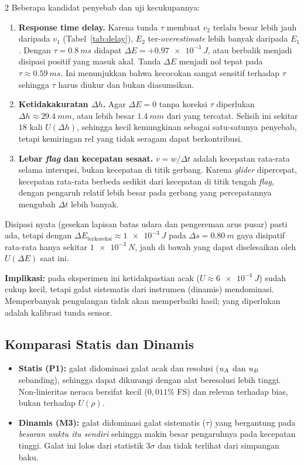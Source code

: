 \documentclass[a4paper, 12pt]{article}
\begin{document}
\begin{multicols}{2}
        Beberapa kandidat penyebab dan uji kecukupannya:
        \begin{enumerate}
            \item \textbf{Response time delay.} Karena tunda $\tau$ membuat $v_2$ terlalu besar lebih jauh daripada $v_1$ (Tabel~\ref{tab:delay}), $E_2$ ter-\textit{overestimate} lebih banyak daripada $E_1$. Dengan $\tau=\SI{0,8}{ms}$ didapat $\Delta E=+\SI{0,97e-3}{J}$, atau berbalik menjadi disipasi positif yang masuk akal. Tanda $\Delta E$ menjadi nol tepat pada $\tau\approx\SI{0,59}{ms}$. Ini menunjukkan bahwa kecocokan sangat sensitif terhadap $\tau$ sehingga $\tau$ harus diukur dan bukan diasumsikan.
            \item \textbf{Ketidakakuratan $\Delta h$.} Agar $\Delta E=0$ tanpa koreksi $\tau$ diperlukan $\Delta h\approx\SI{29,4}{mm}$, atau lebih besar $\SI{1,4}{mm}$ dari yang tercatat. Selisih ini sekitar $18$ kali $U(\Delta h)$, sehingga kecil kemungkinan sebagai satu-satunya penyebab, tetapi kemiringan rel yang tidak seragam dapat berkontribusi.
            \item \textbf{Lebar \textit{flag} dan kecepatan sesaat.} $v=w/\Delta t$ adalah kecepatan rata-rata selama interupsi, bukan kecepatan di titik gerbang. Karena \textit{glider} dipercepat, kecepatan rata-rata berbeda sedikit dari kecepatan di titik tengah \textit{flag}, dengan pengaruh relatif lebih besar pada gerbang yang percepatannya mengubah $\Delta t$ lebih banyak.
        \end{enumerate}
        Disipasi nyata (gesekan lapisan batas udara dan pengereman arus pusar) pasti ada, tetapi dengan $\Delta E_{\text{terkoreksi}}\approx\SI{1e-3}{J}$ pada $\Delta s=\SI{0,80}{m}$ gaya disipatif rata-rata hanya sekitar $\SI{1e-3}{N}$, jauh di bawah yang dapat diselesaikan oleh $U(\Delta E)$ saat ini.

        \textbf{Implikasi:} pada eksperimen ini ketidakpastian acak ($U\approx\SI{6e-4}{J}$) sudah cukup kecil, tetapi galat sistematis dari instrumen (dinamis) mendominasi. Memperbanyak pengulangan tidak akan memperbaiki hasil; yang diperlukan adalah kalibrasi tunda sensor.

        \subsection{Komparasi Statis dan Dinamis}
        \begin{itemize}
            \item \textbf{Statis (P1):} galat didominasi galat acak dan resolusi ($u_{A}$ dan $u_{B}$ sebanding), sehingga dapat dikurangi dengan alat beresolusi lebih tinggi. Non-linieritas neraca bersifat kecil ($0{,}011\%$ FS) dan relevan terhadap bias, bukan terhadap $U(\rho)$.
            \item \textbf{Dinamis (M3):} galat didominasi galat sistematis ($\tau$) yang bergantung pada \textit{besaran waktu itu sendiri} sehingga makin besar pengaruhnya pada kecepatan tinggi. Galat ini lolos dari statistik $3\sigma$ dan tidak terlihat dari simpangan baku.
        \end{itemize}


\end{multicols}
\end{document}
